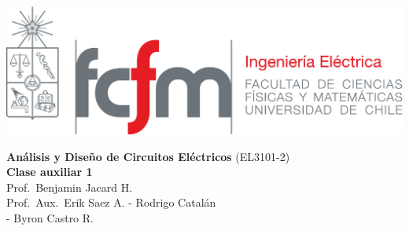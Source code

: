 \documentclass[
  11pt,
  letterpaper,
   addpoints,
   answers
  ]{exam}
\begin{document}
\noindent
\begin{minipage}{0.47\textwidth}
\includegraphics[width=\textwidth]{../fcfm_die}
\end{minipage}
\begin{minipage}{0.53\textwidth}
    
\begin{center} 
\large\textbf{Análisis y Diseño de Circuitos Eléctricos} (EL3101-2) \\
\large\textbf{Clase auxiliar 1} \\
\normalsize Prof.~Benjamin Jacard H.\\
\normalsize Prof.~Aux.~Erik Saez A. - Rodrigo Catalán\\
             - Byron Castro R.
\end{center}
\end{minipage}

\vspace{0.5cm}
\noindent
\vspace{.85cm}
\end{document}
